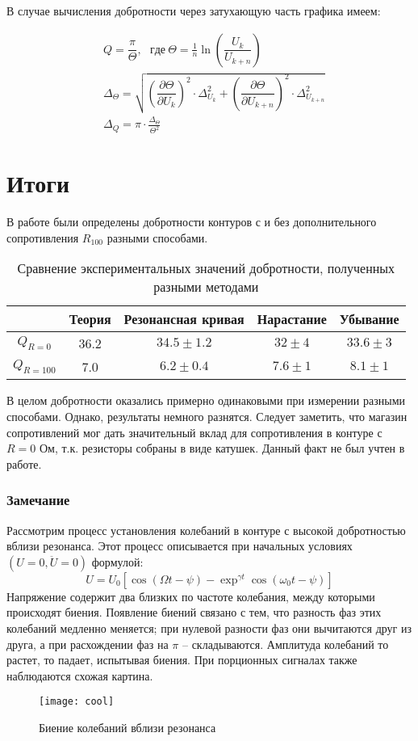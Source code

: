\documentclass{lab}
\begin{document}
В случае вычисления добротности через затухающую часть графика имеем:

\begin{equation}
\begin{aligned}
	&Q = \dfrac{\pi}{\Theta} , ~~~ где \ \Theta = \frac{1}{n} \ln (\dfrac{U_k}{U_{k+n}})\\
	&\Delta_{\Theta} = \sqrt{\left( \dfrac{\partial {\Theta}}{\partial U_k} \right)^2 \cdot \Delta_{U_k}^2 +
	\left( \dfrac{\partial {\Theta}}{\partial U_{k+n}} \right)^2 \cdot \Delta_{U_{k+n}}^2}\\
	&\Delta_Q = \pi \cdot \frac{\Delta_{\Theta}}{\Theta^2}
\end{aligned}
\end{equation}

\section*{Итоги}

В работе были определены добротности контуров с и без дополнительного сопротивления
$ R_{100} $ разными способами.

\begin{table}[H]
	\centering
	\renewcommand{\arraystretch}{1.3}
	\begin{tabular}{|c|c|c|c|c|}
		\hline
		& Теория & Резонансная кривая & Нарастание & Убывание     \\ \hline
		$Q_{R=0}$	& 36.2	& $34.5 \pm 1.2$	& $32 \pm 4$	& $33.6 \pm 3$ \\ \hline
		$Q_{R=100}$	& 7.0	& $6.2 \pm 0.4$		& $7.6 \pm 1$	& $8.1 \pm 1$  \\ \hline
	\end{tabular}
	\caption{\footnotesize Сравнение экспериментальных значений добротности, полученных разными методами}
	\label{tab4}
	\renewcommand{\arraystretch}{1}
\end{table}

В целом добротности оказались примерно одинаковыми при измерении разными способами. Однако,
результаты немного разнятся. Следует заметить, что магазин сопротивлений мог дать
значительный вклад для сопротивления в контуре с $ R = 0 $ Ом, т.к. резисторы собраны в
виде катушек. Данный факт не был учтен в работе.

\subsubsection*{Замечание}
Рассмотрим процесс установления колебаний в контуре с высокой добротностью вблизи резонанса.
Этот процесс описывается при начальных условиях $ (U = 0, \ddot{U} = 0) $ формулой:
$$ U = U_0[\cos(\Omega t - \psi) - \exp^{\gamma t} \cos (\omega_0 t - \psi)] $$
Напряжение содержит два близких по частоте колебания, между которыми происходят биения.
Появление биений связано с тем, что разность фаз этих колебаний медленно меняется; при
нулевой разности фаз они вычитаются друг из друга, а при расхождении фаз на $ \pi $ --
складываются. Амплитуда колебаний то растет, то падает, испытывая биения. При порционных
сигналах также наблюдаются схожая картина.

\begin{figure}[!h]
	\centering
	\texttt{[image: cool]}
	\caption{\footnotesize Биение колебаний вблизи резонанса}
\end{figure}
\end{document}
